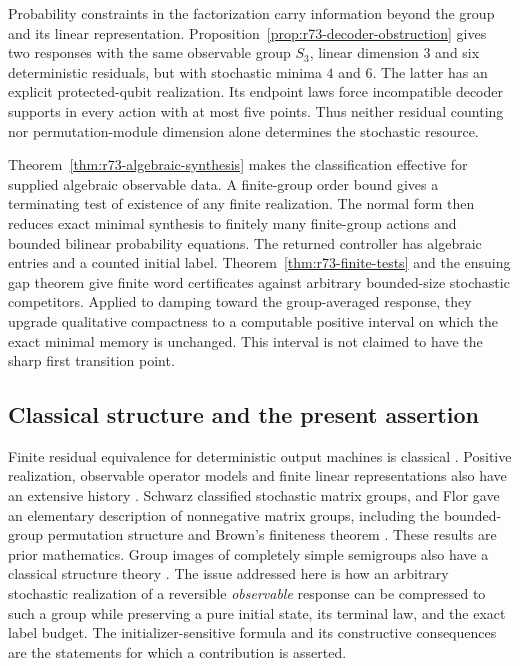 Probability constraints in the factorization carry information beyond the
group and its linear representation. Proposition~\ref{prop:r73-decoder-obstruction}
gives two responses with the same observable group $S_3$, linear dimension
$3$ and six deterministic residuals, but with stochastic minima $4$ and $6$.
The latter has an explicit protected-qubit realization. Its endpoint laws
force incompatible decoder supports in every action with at most five
points. Thus neither residual counting nor permutation-module dimension
alone determines the stochastic resource.

Theorem~\ref{thm:r73-algebraic-synthesis} makes the classification
effective for supplied algebraic observable data. A finite-group order
bound gives a terminating test of existence of any finite realization.
The normal form then reduces exact minimal synthesis to finitely many
finite-group actions and bounded bilinear probability equations.
The returned controller has algebraic entries and a counted initial
label. Theorem~\ref{thm:r73-finite-tests} and the ensuing gap theorem
give finite word certificates against arbitrary bounded-size stochastic
competitors. Applied to damping toward the group-averaged response, they
upgrade qualitative compactness to a computable positive interval on
which the exact minimal memory is unchanged. This interval is not
claimed to have the sharp first transition point.

\subsection*{Classical structure and the present assertion}
Finite residual equivalence for deterministic output machines is
classical \cite{RabinScott59}. Positive realization, observable operator
models and finite linear representations also have an extensive history
\cite{Heller65,CarlylePaz71,Jaeger00,ThonJaeger15,MonrasWinter14}.
Schwarz classified stochastic matrix groups, and Flor gave an elementary
description of nonnegative matrix groups, including the bounded-group
permutation structure and Brown's finiteness theorem
\cite{Schwarz64,Flor69,Brown64}. These results are prior mathematics.
Group images of completely simple semigroups also have a classical
structure theory \cite{Schwarz62}.
The issue addressed here is how an arbitrary stochastic realization of a
reversible \emph{observable} response can be compressed to such a group
while preserving a pure initial state, its terminal law, and the exact
label budget. The initializer-sensitive formula and its constructive
consequences are the statements for which a contribution is asserted.

